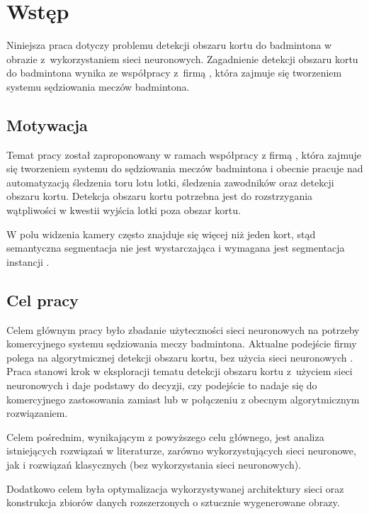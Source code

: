 \chapter{Wstęp}

Niniejsza praca dotyczy problemu detekcji obszaru kortu do badmintona w obrazie z~wykorzystaniem sieci neuronowych.
Zagadnienie detekcji obszaru kortu do badmintona wynika ze współpracy z~firmą \blue{}, która zajmuje się tworzeniem systemu sędziowania meczów badmintona.

\section{Motywacja}

Temat pracy został zaproponowany w ramach współpracy z firmą \blue{}, która zajmuje się tworzeniem systemu do sędziowania meczów badmintona i obecnie pracuje nad automatyzacją śledzenia toru lotu lotki, śledzenia zawodników oraz detekcji obszaru kortu.
Detekcja obszaru kortu potrzebna jest do rozstrzygania wątpliwości w kwestii wyjścia lotki poza obszar kortu.

W polu widzenia kamery często znajduje się więcej niż jeden kort, stąd semantyczna segmentacja nie jest wystarczająca i wymagana jest segmentacja instancji .

\section{Cel pracy}

Celem głównym pracy było zbadanie użyteczności sieci neuronowych na potrzeby komercyjnego systemu sędziowania meczy badmintona.
Aktualne podejście firmy \blue{} polega na algorytmicznej detekcji obszaru kortu, bez użycia sieci neuronowych .
Praca stanowi krok w eksploracji tematu detekcji obszaru kortu z~użyciem sieci neuronowych i daje podstawy do decyzji, czy podejście to nadaje się do komercyjnego zastosowania zamiast lub w połączeniu z obecnym algorytmicznym rozwiązaniem.

Celem pośrednim, wynikającym z powyższego celu głównego, jest analiza istniejących rozwiązań w literaturze, zarówno wykorzystujących sieci neuronowe, jak i rozwiązań klasycznych (bez wykorzystania sieci neuronowych).

Dodatkowo celem była optymalizacja wykorzystywanej architektury sieci oraz konstrukcja zbiorów danych rozszerzonych o sztucznie wygenerowane obrazy.
\\

